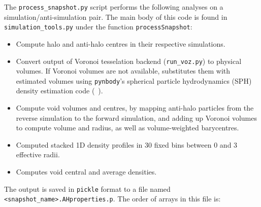 \documentclass{article}
\newcommand{\codefont}[1]{{\texttt{#1}}}
\begin{document}
	The \codefont{process\_snapshot.py} script performs the following analyses on a simulation/anti-simulation pair. The main body of this code is found in \codefont{simulation\_tools.py} under the function \codefont{processSnapshot}:
	\begin{itemize}
		\item Compute halo and anti-halo centres in their respective simulations.
		\item Convert output of Voronoi tesselation backend (\codefont{run\_voz.py}) to physical volumes. If Voronoi volumes are not available, substitutes them with estimated volumes using \codefont{pynbody}'s spherical particle hydrodynamics (SPH) density estimation code (~\citet{pynbody}).
		\item Compute void volumes and centres, by mapping anti-halo particles from the reverse simulation to the forward simulation, and adding up Voronoi volumes to compute volume and radius, as well as volume-weighted barycentres.
		\item Computed stacked 1D density profiles in 30 fixed bins between 0 and 3 effective radii. 
		\item Computes void central and average densities.
	\end{itemize}
	The output is saved in \codefont{pickle} format to a file named \codefont{<snapshot\_name>.AHproperties.p}. The order of arrays in this file is:
\end{document}
